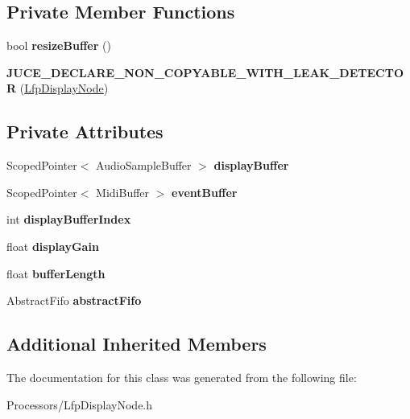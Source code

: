 \subsection*{Private Member Functions}
\begin{DoxyCompactItemize}
\item 
\hypertarget{classLfpDisplayNode_a8e1bb9a83eb0c317c966fd29442f802d}{bool {\bfseries resize\-Buffer} ()}\label{classLfpDisplayNode_a8e1bb9a83eb0c317c966fd29442f802d}

\item 
\hypertarget{classLfpDisplayNode_a6f2053d848c703e0233ec71ffecf7647}{{\bfseries J\-U\-C\-E\-\_\-\-D\-E\-C\-L\-A\-R\-E\-\_\-\-N\-O\-N\-\_\-\-C\-O\-P\-Y\-A\-B\-L\-E\-\_\-\-W\-I\-T\-H\-\_\-\-L\-E\-A\-K\-\_\-\-D\-E\-T\-E\-C\-T\-O\-R} (\hyperlink{classLfpDisplayNode}{Lfp\-Display\-Node})}\label{classLfpDisplayNode_a6f2053d848c703e0233ec71ffecf7647}

\end{DoxyCompactItemize}
\subsection*{Private Attributes}
\begin{DoxyCompactItemize}
\item 
\hypertarget{classLfpDisplayNode_afa2c71f44d39677380462cef2c250a97}{Scoped\-Pointer$<$ Audio\-Sample\-Buffer $>$ {\bfseries display\-Buffer}}\label{classLfpDisplayNode_afa2c71f44d39677380462cef2c250a97}

\item 
\hypertarget{classLfpDisplayNode_adc4fbb762ccc4e7397355ec9611ea0a2}{Scoped\-Pointer$<$ Midi\-Buffer $>$ {\bfseries event\-Buffer}}\label{classLfpDisplayNode_adc4fbb762ccc4e7397355ec9611ea0a2}

\item 
\hypertarget{classLfpDisplayNode_a45b64282f7705772e1aa4221a8bf2740}{int {\bfseries display\-Buffer\-Index}}\label{classLfpDisplayNode_a45b64282f7705772e1aa4221a8bf2740}

\item 
\hypertarget{classLfpDisplayNode_a0d9b987e3f0010a7d75637048d507cc1}{float {\bfseries display\-Gain}}\label{classLfpDisplayNode_a0d9b987e3f0010a7d75637048d507cc1}

\item 
\hypertarget{classLfpDisplayNode_ae9bf0f1ff25193a4ca3cedd24006e652}{float {\bfseries buffer\-Length}}\label{classLfpDisplayNode_ae9bf0f1ff25193a4ca3cedd24006e652}

\item 
\hypertarget{classLfpDisplayNode_ab1ec98d120e9c66ecb4dbcfe2404966d}{Abstract\-Fifo {\bfseries abstract\-Fifo}}\label{classLfpDisplayNode_ab1ec98d120e9c66ecb4dbcfe2404966d}

\end{DoxyCompactItemize}
\subsection*{Additional Inherited Members}


The documentation for this class was generated from the following file\-:\begin{DoxyCompactItemize}
\item 
Processors/Lfp\-Display\-Node.\-h\end{DoxyCompactItemize}
